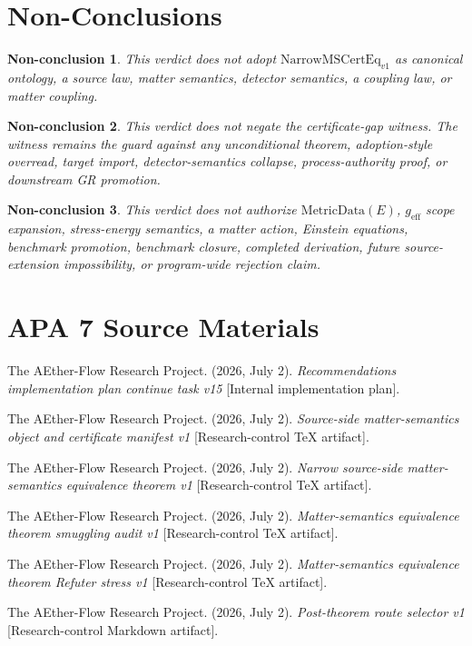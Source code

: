 \documentclass[11pt]{article}
\newcommand{\NarrowMSCertEq}{\mathrm{NarrowMSCertEq}_{v1}}
\newcommand{\MetricData}{\mathrm{MetricData}}
\newcommand{\geff}{g_{\mathrm{eff}}}
\newtheorem{nonconclusion}{Non-conclusion}
\begin{document}
\section{Non-Conclusions}

\begin{nonconclusion}
This verdict does not adopt \(\NarrowMSCertEq\) as canonical ontology, a source
law, matter semantics, detector semantics, a coupling law, or matter coupling.
\end{nonconclusion}

\begin{nonconclusion}
This verdict does not negate the certificate-gap witness. The witness remains
the guard against any unconditional theorem, adoption-style overread, target
import, detector-semantics collapse, process-authority proof, or downstream GR
promotion.
\end{nonconclusion}

\begin{nonconclusion}
This verdict does not authorize \(\MetricData(E)\), \(\geff\) scope expansion,
stress-energy semantics, a matter action, Einstein equations, benchmark
promotion, benchmark closure, completed derivation, future source-extension
impossibility, or program-wide rejection claim.
\end{nonconclusion}

\section{APA 7 Source Materials}

The AEther-Flow Research Project. (2026, July 2). \textit{Recommendations
implementation plan continue task v15} [Internal implementation plan].

The AEther-Flow Research Project. (2026, July 2). \textit{Source-side
matter-semantics object and certificate manifest v1} [Research-control TeX
artifact].

The AEther-Flow Research Project. (2026, July 2). \textit{Narrow source-side
matter-semantics equivalence theorem v1} [Research-control TeX artifact].

The AEther-Flow Research Project. (2026, July 2). \textit{Matter-semantics
equivalence theorem smuggling audit v1} [Research-control TeX artifact].

The AEther-Flow Research Project. (2026, July 2). \textit{Matter-semantics
equivalence theorem Refuter stress v1} [Research-control TeX artifact].

The AEther-Flow Research Project. (2026, July 2). \textit{Post-theorem route
selector v1} [Research-control Markdown artifact].
\end{document}
